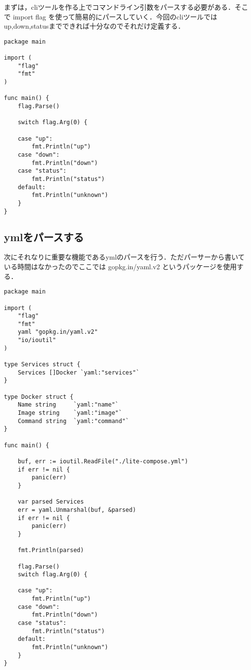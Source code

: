 まずは，cliツールを作る上でコマンドライン引数をパースする必要がある．そこで import flag を使って簡易的にパースしていく．今回のcliツールではup,down,statusまでできれば十分なのでそれだけ定義する．

\begin{verbatim}
package main

import (
    "flag"
    "fmt"
)

func main() {
    flag.Parse()

    switch flag.Arg(0) {

    case "up":
        fmt.Println("up")
    case "down":
        fmt.Println("down")
    case "status":
        fmt.Println("status")
    default:
        fmt.Println("unknown")
    }
}
\end{verbatim}

\subsection{ymlをパースする}

次にそれなりに重要な機能であるymlのパースを行う．ただパーサーから書いている時間はなかったのでここでは gopkg.in/yaml.v2 というパッケージを使用する．

\begin{verbatim}
package main

import (
    "flag"
    "fmt"
    yaml "gopkg.in/yaml.v2"
    "io/ioutil"
)

type Services struct {
    Services []Docker `yaml:"services"`
}

type Docker struct {
    Name string     `yaml:"name"`
    Image string    `yaml:"image"`
    Command string  `yaml:"command"`
}

func main() {

    buf, err := ioutil.ReadFile("./lite-compose.yml")
    if err != nil {
        panic(err)
    }

    var parsed Services
    err = yaml.Unmarshal(buf, &parsed)
    if err != nil {
        panic(err)
    }

    fmt.Println(parsed)

    flag.Parse()
    switch flag.Arg(0) {

    case "up":
        fmt.Println("up")
    case "down":
        fmt.Println("down")
    case "status":
        fmt.Println("status")
    default:
        fmt.Println("unknown")
    }
}
\end{verbatim}

